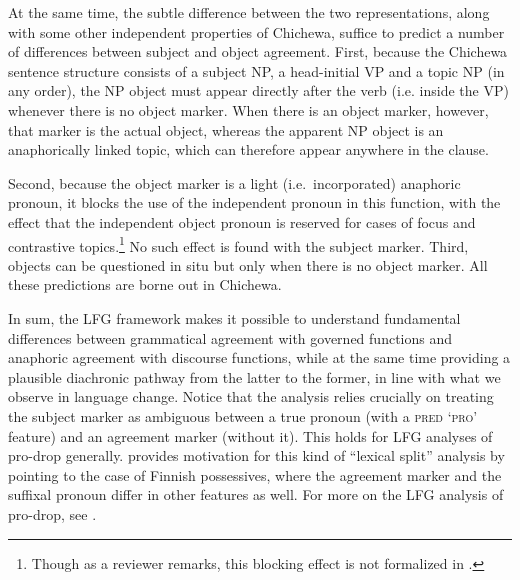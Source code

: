 \documentclass[output=paper,hidelinks]{langscibook}
\begin{document}
At the same time, the subtle difference between the two
representations, along with some other independent properties of
Chichewa, suffice to predict a number of differences between subject
and object agreement.  First, because the Chichewa
sentence structure consists of a subject NP, a head-initial VP and a
topic NP (in any order), the NP object must appear directly after the verb
(i.e. inside the VP) whenever there is no object marker. When there is an object marker, however, that marker is the actual object, whereas the apparent NP object is an anaphorically linked topic, which can therefore appear anywhere in the clause.

Second, because the object marker is a light (i.e.\ incorporated)
anaphoric pronoun, it blocks the use of the independent pronoun in
this function, with the effect that the independent object pronoun is
reserved for cases of focus and contrastive topics.\footnote{Though as
a reviewer remarks, this blocking effect is not formalized in
\citet{BM87}.} No such effect is found with the subject marker. Third,
objects can be questioned in situ but only when there is no object
marker.  All these predictions are borne out in Chichewa.

\hspace*{-.5mm}In sum, the LFG framework makes it possible to understand fundamental
differences between grammatical agreement with governed functions and
anaphoric agreement with discourse functions, while at the same time
providing a plausible diachronic pathway from the latter to the
former, in line with what we observe in language change. Notice that
the analysis relies crucially on treating the subject marker as
ambiguous between a true pronoun (with a \textsc{pred `pro'} feature)
and an agreement marker (without it). This holds for LFG analyses of
pro-drop generally. \textcite{Toivonen:FinnPoss} provides motivation
for this kind of “lexical split” analysis by pointing to the case of
Finnish possessives, where the agreement marker and the suffixal
pronoun differ in other features as well.  For more on the LFG
analysis of pro-drop, see .
\end{document}
